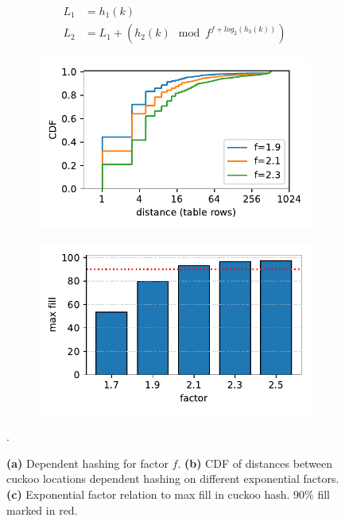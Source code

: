 \begin{figure}[t]
    \centering
    \begin{subfigure}{0.3\linewidth}
        \begin{align*}
            L_1 &= h_1(k) \\
            L_2 &= L_1 + (h_2(k)\mod f^{f + log_2(h_3(k))})
        \end{align*}
    \end{subfigure}
    \begin{subfigure}{0.3\linewidth}
        \includegraphics[width=0.99\linewidth]{fig/hash_factor.pdf}
    \end{subfigure}
    \begin{subfigure}{0.3\linewidth}
        \includegraphics[width=0.99\linewidth]{fig/hash_fill.pdf}
    \end{subfigure}.
    \vspace{-1em}
    \caption{
    \textbf{(a)} Dependent hashing for factor $f$.
    \textbf{(b)} CDF of distances between cuckoo locations dependent hashing on different exponential factors.
    \textbf{(c)} Exponential factor relation to max fill in cuckoo hash. 90\% fill marked in red.
    }
    \label{fig:locality-hashing}

\end{figure}




